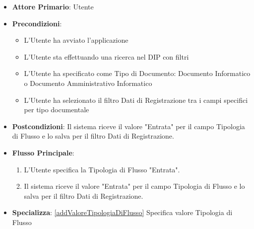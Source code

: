 \begin{itemize}
      \item \textbf{Attore Primario}: Utente
      \item \textbf{Precondizioni}: 
      \begin{itemize}            
            \item L'Utente ha avviato l'applicazione
            \item L'Utente sta effettuando una ricerca nel DIP con filtri
            \item L'Utente ha specificato come Tipo di Documento: Documento Informatico o Documento Amministrativo Informatico
            \item L'Utente ha selezionato il filtro Dati di Registrazione tra i campi specifici per tipo documentale
      \end{itemize}
      \item \textbf{Postcondizioni}: Il sistema riceve il valore "Entrata" per il campo Tipologia di Flusso e lo salva per il filtro Dati di Registrazione.
      \item \textbf{Flusso Principale}:
      \begin{enumerate}
            \item L'Utente specifica la Tipologia di Flusso "Entrata".
            \item Il sistema riceve il valore "Entrata" per il campo Tipologia di Flusso e lo salva per il filtro Dati di Registrazione.
      \end{enumerate}
      \item \textbf{Specializza}: \ref{addValoreTipologiaDiFlusso} Specifica valore Tipologia di Flusso
\end{itemize}

